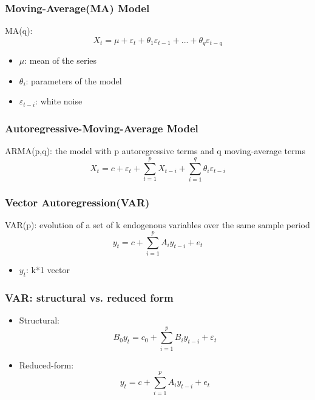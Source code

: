 \documentclass{beamer}
\begin{document}
\begin{frame}
\frametitle{Moving-Average(MA) Model\footnotemark}
MA(q):
$$
X_t=\mu+\varepsilon_t+\theta_1\varepsilon_{t-1}+...+\theta_q\varepsilon_{t-q}
$$
\begin{itemize}
\item $\mu$: mean of the series
\item $\theta_i$: parameters of the model
\item $\varepsilon_{t-i}$: white noise
\end{itemize}
\end{frame}

\begin{frame}
\frametitle{Autoregressive-Moving-Average Model}
ARMA(p,q): the model with p autoregressive terms and q moving-average terms
$$
X_t = c + \varepsilon_t + \sum_{t=1}^pX_{t-i}+\sum_{i=1}^{q}\theta_i\varepsilon_{t-i}
$$
\begin{itemize}
\end{itemize}
\end{frame}

\begin{frame}
\frametitle{Vector Autoregression(VAR)}
VAR(p): evolution of a set of k endogenous variables over the same sample period
$$
y_t = c + \sum_{i=1}^p A_i y_{t-i}+e_t
$$
\begin{itemize}
\item $y_t$: k*1 vector
\end{itemize}
\end{frame}

\begin{frame}
\frametitle{VAR: structural vs. reduced form}
\begin{itemize}
\item Structural:
$$
B_0y_t=c_0+\sum_{i=1}^{p}B_i y_{t-i}+\varepsilon_t
$$
\item Reduced-form:
$$
y_t = c + \sum_{i=1}^p A_i y_{t-i}+e_t
$$
\end{itemize}
\end{frame}
\end{document}
